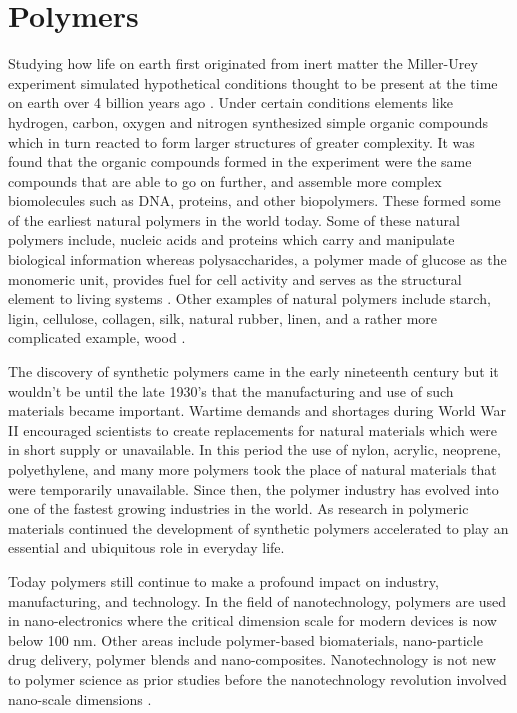 \chapter{Polymers}

Studying how life on earth first originated from inert matter the Miller-Urey experiment simulated hypothetical conditions thought to be present at the time on earth over 4 billion years ago \cite{Miller1959}. Under certain conditions elements like hydrogen, carbon, oxygen and nitrogen synthesized simple organic compounds which in turn reacted to form larger structures of greater complexity. It was found that the organic compounds formed in the experiment were the same compounds that are able to go on further, and assemble more complex biomolecules such as DNA, proteins, and other biopolymers. These formed some of the earliest natural polymers in the world today. Some of these natural polymers include, nucleic acids and proteins which carry and manipulate biological information whereas polysaccharides, a polymer made of glucose as the monomeric unit, provides fuel for cell activity and serves as the structural element to living systems \cite{karp2005}. Other examples of natural polymers include starch, ligin, cellulose, collagen, silk, natural rubber, linen, and a rather more complicated example, wood \cite{Staudinger1953}.  

The discovery of synthetic polymers came in the early nineteenth century but it wouldn't be until the late 1930's that the manufacturing and use of such materials became important. Wartime demands and shortages during World War II encouraged scientists to create replacements for natural materials which were in short supply or unavailable. In this period the use of nylon, acrylic, neoprene, polyethylene, and many more polymers took the place of natural materials that were temporarily unavailable. Since then, the polymer industry has evolved into one of the fastest growing industries in the world. As research in polymeric materials continued the development of synthetic polymers accelerated to play an essential and ubiquitous role in everyday life.

Today polymers still continue to make a profound impact on industry, manufacturing, and technology.  In the field of nanotechnology, polymers are used in nano-electronics where the critical dimension scale for modern devices is now below 100 nm. Other areas include polymer-based biomaterials, nano-particle drug delivery, polymer blends and nano-composites. Nanotechnology is not new to polymer science as prior studies before the nanotechnology revolution involved nano-scale dimensions \cite{Samad2009,Paul2008}.  


